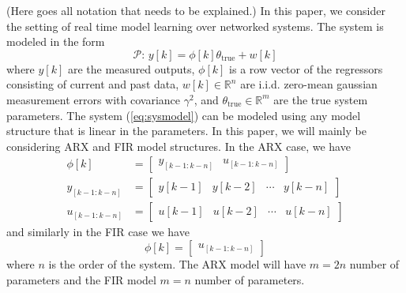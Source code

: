 
{\color{red}(Here goes all notation that needs to be explained.)}
In this paper, we consider the setting of real time model learning over
networked  systems. The system is modeled in the form
\begin{equation}
        \mathcal{P}:\, y[k] = \phi[k]\theta_{\text{true}} + w[k]
        \label{eq:sysmodel}
\end{equation}
where $y[k]$ are the measured outputs, $\phi[k]$ is a row vector of
the regressors consisting of current and past data, $w[k] \in \mathbb{R}^n$
are i.i.d. zero-mean gaussian measurement errors with covariance $\gamma^2$, and
$\theta_{\text{true}} \in \mathbb{R}^m$ are the true system parameters.
The system (\ref{eq:sysmodel}) can be modeled using any model structure that
is linear in the parameters. In this paper, we will mainly be considering
ARX and FIR model structures. In the ARX case, we have
\begin{equation}
        \begin{split}
                \phi[k] &= \begin{bmatrix}
                        y_{[k-1:k-n]} & u_{[k-1:k-n]}  
                \end{bmatrix} \\
                y_{[k-1:k-n]} &= \begin{bmatrix}
                        y[k-1] & y[k-2] & \cdots & y[k-n]
                \end{bmatrix} \\
                u_{[k-1:k-n]}  &= \begin{bmatrix}
                        u[k-1] & u[k-2] & \cdots & u[k-n]
                \end{bmatrix}
        \end{split}
\end{equation}
and similarly in the FIR case we have
\begin{equation}
        \phi[k] = \begin{bmatrix}
                u_{[k-1:k-n]}  
        \end{bmatrix}
\end{equation}
where $n$ is the order of the system. \cite{ljung_system_1999} The ARX model 
will have $m=2n$ number of parameters and the FIR model $m=n$ number of parameters.

